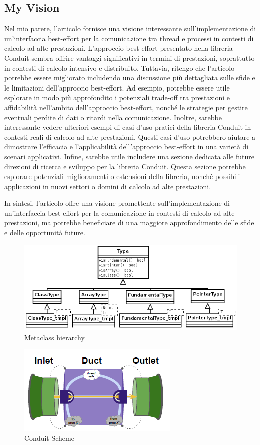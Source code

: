 \documentclass[11pt]{article}
\begin{document}
\begin{multicols*}{2}[\columnsep=1cm]
\subsection{My Vision}
Nel mio parere, l'articolo fornisce una visione interessante sull'implementazione di un'interfaccia best-effort per la comunicazione tra thread e processi in contesti di calcolo ad alte prestazioni. L'approccio best-effort presentato nella libreria Conduit sembra offrire vantaggi significativi in termini di prestazioni, soprattutto in contesti di calcolo intensivo e distribuito.
Tuttavia, ritengo che l'articolo potrebbe essere migliorato includendo una discussione più dettagliata sulle sfide e le limitazioni dell'approccio best-effort. Ad esempio, potrebbe essere utile esplorare in modo più approfondito i potenziali trade-off tra prestazioni e affidabilità nell'ambito dell'approccio best-effort, nonché le strategie per gestire eventuali perdite di dati o ritardi nella comunicazione.
Inoltre, sarebbe interessante vedere ulteriori esempi di casi d'uso pratici della libreria Conduit in contesti reali di calcolo ad alte prestazioni. Questi casi d'uso potrebbero aiutare a dimostrare l'efficacia e l'applicabilità dell'approccio best-effort in una varietà di scenari applicativi.
Infine, sarebbe utile includere una sezione dedicata alle future direzioni di ricerca e sviluppo per la libreria Conduit. Questa sezione potrebbe esplorare potenziali miglioramenti o estensioni della libreria, nonché possibili applicazioni in nuovi settori o domini di calcolo ad alte prestazioni.

In sintesi, l'articolo offre una visione promettente sull'implementazione di un'interfaccia best-effort per la comunicazione in contesti di calcolo ad alte prestazioni, ma potrebbe beneficiare di una maggiore approfondimento delle sfide e delle opportunità future.
\end{multicols*}

\begin{figure}
    \centering
    \includegraphics[width=0.5\linewidth]{ClassType.png}
    \caption{Metaclass hierarchy}
    \label{fig:ClassType}
\end{figure}

\begin{figure}
    \centering
    \includegraphics[width=0.5\linewidth]{Conduit.png}
    \caption{Conduit Scheme}
    \label{fig:Conduit}
\end{figure}

\printbibliography
\end{document}
